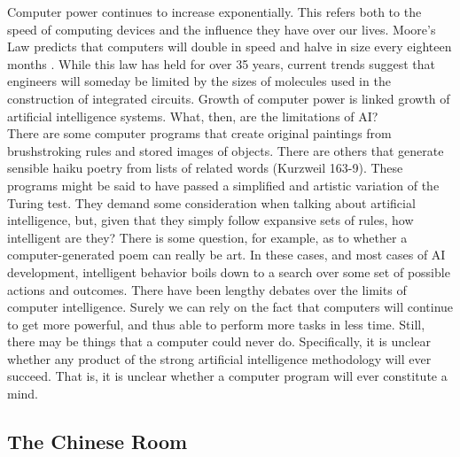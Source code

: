     Computer power continues to increase exponentially. This refers both to the
speed of computing devices and the influence they have over our lives. Moore’s Law
predicts that computers will double in speed and halve in size every eighteen months
\cite{five}. While this law has held for over 35 years, current trends suggest that
engineers will someday be limited by the sizes of molecules used in the construction of
integrated circuits. Growth of computer power is linked growth of artificial intelligence
systems. What, then, are the limitations of AI?\\
There are some computer programs that create original paintings from brushstroking
rules and stored images of objects. There are others that generate sensible haiku
poetry from lists of related words (Kurzweil 163-9). These programs might be said to
have passed a simplified and artistic variation of the Turing test. They demand some
consideration when talking about artificial intelligence, but, given that they simply follow
expansive sets of rules, how intelligent are they? There is some question, for example, as
to whether a computer-generated poem can really be art. In these cases, and most cases
of AI development, intelligent behavior boils down to a search over some set of possible
actions and outcomes.
There have been lengthy debates over the limits of computer intelligence. Surely
we can rely on the fact that computers will continue to get more powerful, and thus able to perform more tasks in less time. Still, there may be things that a computer could never
do. Specifically, it is unclear whether any product of the strong artificial intelligence
methodology will ever succeed. That is, it is unclear whether a computer program will
ever constitute a mind.
    \subsection{The Chinese Room}


